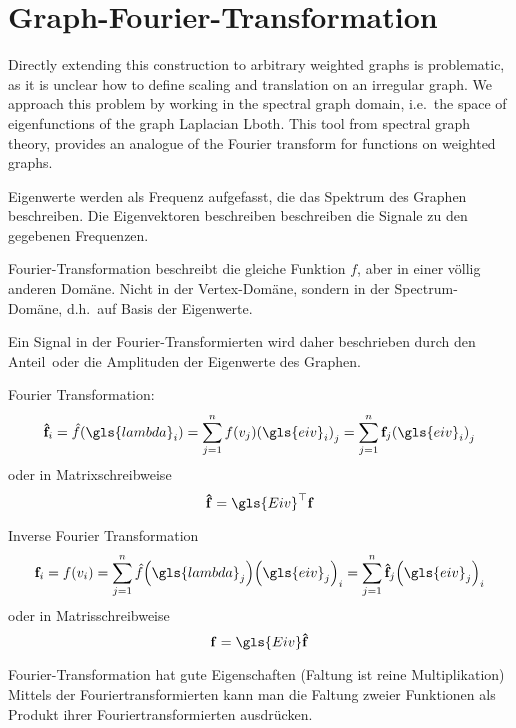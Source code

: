 \section{Graph-Fourier-Transformation}

Directly extending this construction to arbitrary weighted graphs is problematic, as it is unclear
how to define scaling and translation on an irregular graph.
We approach this problem by working in the spectral graph domain, i.e.\ the space of eigenfunctions of the graph Laplacian \gls{Lboth}.
This tool from spectral graph theory, provides an analogue of the Fourier transform for functions on weighted graphs.

Eigenwerte werden als Frequenz aufgefasst, die das Spektrum des Graphen beschreiben.
Die Eigenvektoren beschreiben beschreiben die Signale zu den gegebenen Frequenzen.

Fourier-Transformation beschreibt die gleiche Funktion $f$, aber in einer völlig anderen Domäne.
Nicht in der Vertex-Domäne, sondern in der Spectrum-Domäne, d.h.\ auf Basis der Eigenwerte.

Ein Signal in der Fourier-Transformierten wird daher beschrieben durch den \glqq{}Anteil\grqq\ oder die Amplituden der Eigenwerte des Graphen.

Fourier Transformation:
\begin{equation}
  \ve{\hat f}_i = \hat f\left(\gls{lambda}_i\right) = \sum_{j=1}^{n} f\left(v_j\right) {\left(\gls{eiv}_i\right)}_j = \sum_{j=1}^{n} \ve{f}_j {\left(\gls{eiv}_i\right)}_j
\end{equation}
oder in Matrixschreibweise
\begin{equation}
  \ve{\hat f} = \gls{Eiv}^{\top}\ve{f}
\end{equation}

Inverse Fourier Transformation
\begin{equation}
  \ve{f}_i = f\left(v_i\right) = \sum_{j=1}^n \hat f\left(\gls{lambda}_j\right) {\left(\gls{eiv}_j\right)}_i = \sum_{j=1}^n \ve{\hat f}_j {\left(\gls{eiv}_j\right)}_i
\end{equation}
oder in Matrisschreibweise
\begin{equation}
  \ve{f} = \gls{Eiv}\ve{\hat f}
\end{equation}

Fourier-Transformation hat gute Eigenschaften (Faltung ist reine Multiplikation)
Mittels der Fouriertransformierten kann man die Faltung zweier Funktionen als Produkt ihrer Fouriertransformierten ausdrücken.


